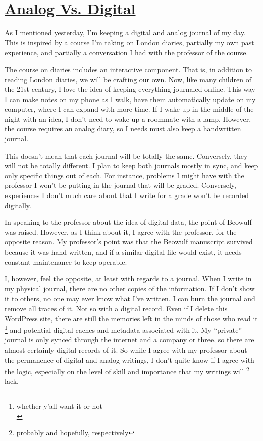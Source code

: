 \hypertarget{analog-vs-digital}{%
\section{\href{analog-vs-digital.html}{Analog Vs. Digital}}\label{analog-vs.-digital}}

As I mentioned \href{how-im-keeping-track-of-my-time-abroad.html}{yesterday},
I'm keeping a digital and analog journal of my day. This is inspired by
a course I'm taking on London diaries, partially my own past experience,
and partially a conversation I had with the professor of the course.

The course on diaries includes an interactive component. That is, in
addition to reading London diaries, we will be crafting our own. Now,
like many children of the 21st century, I love the idea of keeping
everything journaled online. This way I can make notes on my phone as I
walk, have them automatically update on my computer, where I can expand
with more time. If I wake up in the middle of the night with an idea, I
don't need to wake up a roommate with a lamp. However, the course
requires an analog diary, so I needs must also keep a handwritten
journal.

This doesn't mean that each journal will be totally the same.
Conversely, they will not be totally different. I plan to keep both
journals mostly in sync, and keep only specific things out of each. For
instance, problems I might have with the professor I won't be putting in
the journal that will be graded. Conversely, experiences I don't much
care about that I write for a grade won't be recorded digitally.

In speaking to the professor about the idea of digital data, the point
of Beowulf was raised. However, as I think about it, I agree with the
professor, for the opposite reason. My professor's point was that the
Beowulf manuscript survived because it was hand written, and if a
similar digital file would exist, it needs constant maintenance to keep
operable.

I, however, feel the opposite, at least with regards to a journal. When
I write in my physical journal, there are no other copies of the
information. If I don't show it to others, no one may ever know what
I've written. I can burn the journal and remove all traces of it. Not so
with a digital record. Even if I delete this WordPress site, there are
still the memories left in the minds of those who read it \footnote{whether
  y'all want it or not\\} and potential digital caches and metadata
associated with it. My ``private'' journal is only synced through the
internet and a company or three, so there are almost certainly digital
records of it. So while I agree with my professor about the permanence
of digital and analog writings, I don't quite know if I agree with the
logic, especially on the level of skill and importance that my writings
will \footnote{probably and hopefully, respectively} lack.
